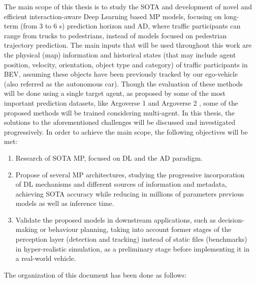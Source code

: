 The main scope of this thesis is to study the \ac{SOTA} and development of novel and efficient interaction-aware Deep Learning based \ac{MP} models, focusing on long-term (from 3 to 6 s) prediction horizon and \ac{AD}, where traffic participants can range from trucks to pedestrians, instead of models focused on pedestrian trajectory prediction. The main inputs that will be used throughout this work are the physical (map) information and historical states (that may include agent position, velocity, orientation, object type and category) of traffic participants in \ac{BEV}, assuming these objects have been previously tracked by our ego-vehicle (also referred as the autonomous car). Though the evaluation of these methods will be done using a single target agent, as proposed by some of the most important prediction datasets, like Argoverse 1 \cite{chang2019argoverse} and Argoverse 2 \cite{wilson2023argoverse}, some of the proposed methods will be trained considering multi-agent. In this thesis, the solutions to the aforementioned challenges will be discussed and investigated progressively. In order to achieve the main scope, the following objectives will be met:

\begin{enumerate}
	\item Research of \ac{SOTA} \ac{MP}, focused on \ac{DL} and the \ac{AD} paradigm.
	\item Propose of several \ac{MP} architectures, studying the progressive incorporation of \ac{DL} mechanisms and different sources of information and metadata, achieving \ac{SOTA} accuracy while reducing in millions of parameters previous models as well as inference time.
	\item Validate the proposed models in downstream applications, such as decision-making or behaviour planning, taking into account former stages of the perception layer (detection and tracking) instead of static files (benchmarks) in hyper-realistic simulation, as a preliminary stage before implementing it in a real-world vehicle.
\end{enumerate}

The organization of this document has been done as follows:

